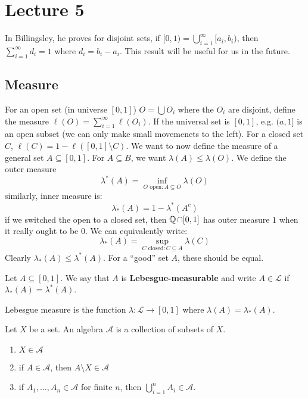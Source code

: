 \newcommand*{\mca}{\mathcal{A}}

\section{Lecture 5}
In Billingsley, he proves for disjoint sets, if $[0, 1) = \bigcup_{i = 1}^{\infty} [a_i, b_i)$,
then $\sum_{i = 1}^{\infty} d_i = 1$ where $d_i = b_i - a_i$. This result will be useful for us in the future.
\subsection{Measure}
For an open set (in universe $[0, 1]$) $O = \bigcup O_i$ where the $O_i$ are disjoint, define the measure $\ell(O) = \sum_{i = 1}^{\infty} \ell(O_i)$. If the universal
set is $[0, 1]$, e.g. $(a, 1]$ is an open subset (we can only make small movemenets to the left).
For a closed set $C$, $\ell(C) = 1 - \ell([0, 1]\setminus C)$. We want to now define the measure of a general set
$A \subseteq [0, 1]$. For $A \subseteq B$, we want $\lambda(A) \leq \lambda(O)$. We define the outer measure 
\[ \lambda^*(A)  = \inf_{O \text{ open}: A \subseteq O} \lambda(O)\]
similarly, inner measure is:
\[ \lambda_*(A) = 1 - \lambda^*(A^c) \]
if we switched the open to a closed set, then $\operatorname{\mathbb{Q}} \cap [0, 1]$ has outer measure $1$ when it really ought to be 0.
We can equivalently write:
\[ \lambda_*(A) = \sup_{C \text{ closed}: C \subseteq A} \lambda(C) \]
Clearly $\lambda_*(A) \leq \lambda^*(A)$. For a ``good'' set $A$, these should be equal.
\begin{definition}
    Let $A \subseteq [0, 1]$. We say that $A$ is \textbf{Lebesgue-measurable} and write $A \in \mathcal{L}$ if $\lambda_*(A) = \lambda^*(A)$.
\end{definition}
\begin{definition}
    Lebesgue measure is the function $\lambda: \mathcal{L} \to [0, 1]$ where $\lambda(A) = \lambda_*(A)$.
\end{definition}
\begin{definition}
    Let $X$ be a set. An algebra $\mca$ is a collection of subsets of $X$.
    \begin{enumerate}
        \item $X \in \mathcal{A}$
        \item if $A \in \mathcal{A}$, then $A \setminus X \in \mathcal{A}$
        \item if $A_1, \dots, A_n \in \mca$ for finite $n$, then $\bigcup_{i = 1}^n A_i \in \mca$.
    \end{enumerate}
\end{definition}
